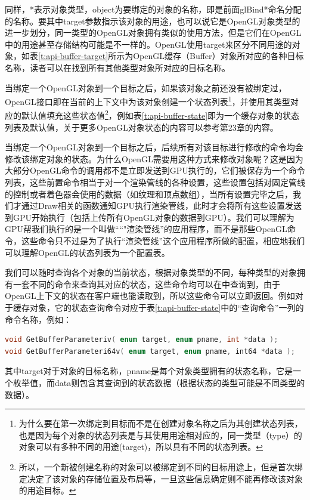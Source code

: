 同样，*表示对象类型，object为要绑定的对象的名称，即是前面glBind*命名分配的名称。要其中target参数指示该对象的用途，也可以说它是OpenGL对象类型的进一步划分，同一类型的OpenGL对象拥有类似的使用方法，但是它们在OpenGL中的用途甚至存储结构可能是不一样的。OpenGL使用target来区分不同用途的对象，如表\ref{t:api-buffer-target}所示为OpenGL缓存（Buffer）对象所对应的各种目标名称，读者可以在\cite{b:OpenGL4.5CoreProfile}找到所有其他类型对象所对应的目标名称。


当绑定一个OpenGL对象到一个目标之后，如果该对象之前还没有被绑定过，OpenGL接口即在当前的上下文中为该对象创建一个状态列表\footnote{为什么要在第一次绑定到目标而不是在创建对象名称之后为其创建状态列表，也是因为每个对象的状态列表是与其使用用途相对应的，同一类型（type）的对象可以有多种不同的用途(target)，所以具有不同的状态列表。}，并使用其类型对应的默认值填充这些状态值\footnote{所以，一个新被创建名称的对象可以被绑定到不同的目标用途上，但是首次绑定决定了该对象的存储位置及布局等，一旦这些信息确定则不能再修改该对象的用途目标。}，例如表\ref{t:api-buffer-state}即为一个缓存对象的状态列表及默认值，关于更多OpenGL对象状态的内容可以参考\cite{b:OpenGL4.5CoreProfile}第23章的内容。

当绑定一个OpenGL对象到一个目标之后，后续所有对该目标进行修改的命令均会修改该绑定对象的状态。为什么OpenGL需要用这种方式来修改对象呢？这是因为大部分OpenGL命令的调用都不是立即发送到GPU执行的，它们被保存为一个命令列表，这些前置命令相当于对一个渲染管线的各种设置，这些设置包括对固定管线的控制或者着色器会使用的数据（如纹理和顶点数组），当所有设置完毕之后，我们才通过Draw相关的函数通知GPU执行渲染管线，此时才会将所有这些设置发送到GPU开始执行（包括上传所有OpenGL对象的数据到GPU）。我们可以理解为GPU帮我们执行的是一个叫做““"渲染管线”的应用程序，而不是那些OpenGL命令，这些命令只不过是为了执行“渲染管线”这个应用程序所做的配置，相应地我们可以理解OpenGL的状态列表为一个配置表。

我们可以随时查询各个对象的当前状态，根据对象类型的不同，每种类型的对象拥有一套不同的命令来查询其对应的状态，这些命令均可以在\cite{b:OpenGL4.5CoreProfile}中查询到，由于OpenGL上下文的状态在客户端也能读取到，所以这些命令可以立即返回。例如对于缓存对象，它的状态查询命令对应于表\ref{t:api-buffer-state}中的“查询命令”一列的命令名称，例如：

\begin{lstlisting}[language=C++]
void GetBufferParameteriv( enum target, enum pname, int *data );
void GetBufferParameteri64v( enum target, enum pname, int64 *data );
\end{lstlisting}

其中target对于对象的目标名称，pname是每个对象类型拥有的状态名称，它是一个枚举值，而data则包含其查询到的状态数据（根据状态的类型可能是不同类型的数据）。

